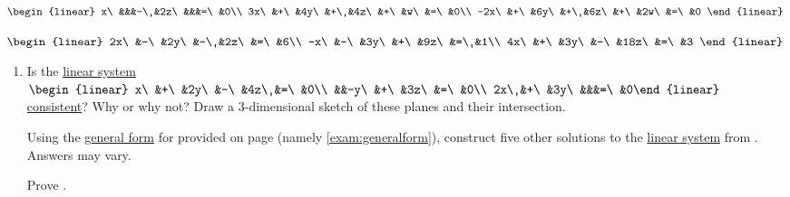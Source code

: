 \begin{enumerate}[!HW!]
\begin{multicols}{3}
\itemspade $\begin{linear} x\ &&&-\ &2z\ &&&=\ &0\\ 3x\ &+\ &4y\ &+\ &4z\ &+\ &w\ &=\ &0\\ -2x\ &+\ &6y\ &+\ &6z\ &+\ &2w\ &=\ &0 \end{linear}$ %
 \end{multicols}
\begin{multicols}{3}
\item\label{exer:homogeneoussystemstop} $\begin{linear} 2x\ &-\ &2y\ &-\ &2z\ &=\ &6\\ -x\ &-\ &3y\ &+\ &9z\ &=\ &1\\ 4x\ &+\ &3y\ &-\ &18z\ &=\ &3 \end{linear}$ %
 \end{multicols}
 \end{enumerate}\vs
 
\begin{enumerate}[!HW!]
\item\label{exer:homogeneoussystemhint} Is the \hyperref[def:linearsystem]{linear system} $\begin{linear} x\ &+\ &2y\ &-\ &4z\ &=\ &0\\ &&-y\ &+\ &3z\ &=\ &0\\ 2x\ &+\ &3y\ &&&=\ &0\end{linear}$ \hyperref[def:consistent]{consistent}? Why or why not? Draw a 3-dimensional sketch of these planes and their intersection.  %

\itemspade Using the \hyperref[exam:generalform]{general form} for  provided on page \pageref{exam:generalform} (namely \eqref{exam:generalform}), construct five other solutions to the \hyperref[def:linearsystem]{linear system} from . Answers may vary.

\itemspade Prove .
\end{enumerate}


\pagebreak